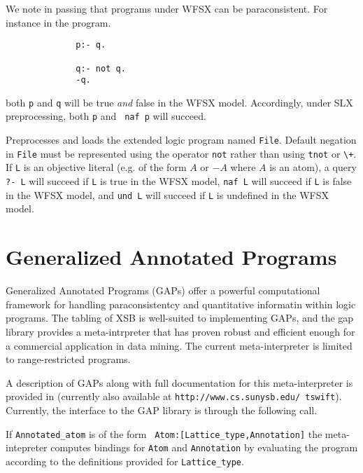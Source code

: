 We note in passing that programs under WFSX can be paraconsistent.
For instance in the program.
{\small
\begin{verbatim}
              p:- q.

              q:- not q.
              -q.
\end{verbatim}
}
both {\tt p} and {\tt q} will be true {\em and} false in the WFSX
model.  Accordingly, under SLX preprocessing, both {\tt p} and {\tt
naf p} will succeed.

\begin{description}
Preprocesses and loads the extended logic program named {\tt File}.
Default negation in {\tt File} must be represented using the operator
{\tt not} rather than using {\tt tnot} or \verb|\+|.  If {\tt L} is an
objective literal (e.g. of the form $A$ or $-A$ where $A$ is an atom),
a query {\tt ?- L} will succeed if {\tt L} is true in the WFSX model,
{\tt naf L} will succeed if {\tt L} is false in the WFSX model, and
{\tt und L} will succeed if {\tt L} is undefined in the WFSX model.
\end{description}


\section{Generalized Annotated Programs}  \label{library_utilities:gap}

Generalized Annotated Programs (GAPs) \cite{KiSu92} offer a powerful
computational framework for handling paraconsistentcy and quantitative
informatin within logic programs.  The tabling of XSB is well-suited
to implementing GAPs, and the gap library provides a meta-intrpreter
that has proven robust and efficient enough for a commercial
application in data mining.  The current meta-interpreter is limited
to range-restricted programs.

A description of GAPs along with full documentation for this
meta-interpreter is provided in \cite{Swif99a} (currently also
available at {\tt http://www.cs.sunysb.edu/~tswift}).  Currently, the
interface to the GAP library is through the following call.

\begin{description}
%
If {\tt Annotated\_atom} is of the form {\tt
Atom:[Lattice\_type,Annotation]} the meta-intepreter computes bindings
for {\tt Atom} and {\tt Annotation} by evaluating the program
according to the definitions provided for {\tt Lattice\_type}.
\end{description}

